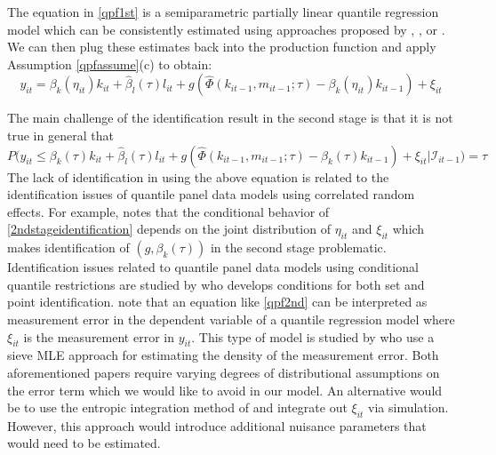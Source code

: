 \documentclass[11pt]{article}
\begin{document}
The equation in \eqref{qpf1st} is a semiparametric partially linear quantile regression model which can be consistently estimated using approaches proposed by \cite{Lee2003}, \cite{KOENKER1994}, or \cite{Chen2009}. We can then plug these estimates back into the production function and apply Assumption \eqref{qpfassume}(c) to obtain:
\begin{equation} \label{qpf2nd}
y_{it}=\beta_{k}(\eta_{it})k_{it}+\hat{\beta}_{l}(\tau)l_{it}+g(\hat{\Phi}(k_{it-1}, m_{it-1}; \tau)-\beta_{k}(\eta_{it})k_{it-1})+\xi_{it}
\end{equation}

The main challenge of the identification result in the second stage is that it is not true in general that
\begin{equation} \label{2ndstageidentification}
P\big(y_{it}\leq \beta_{k}(\tau)k_{it}+\hat{\beta}_{l}(\tau)l_{it}+g(\hat{\Phi}(k_{it-1}, m_{it-1}; \tau)-\beta_{k}(\tau)k_{it-1})+\xi_{it}|\mathcal{I}_{it-1}\big)=\tau
\end{equation}
The lack of identification in using the above equation is related to the identification issues of quantile panel data models using correlated random effects. For example, \cite{Canay2011} notes that the conditional behavior of \eqref{2ndstageidentification} depends on the joint distribution of $\eta_{it}$ and $\xi_{it}$ which makes identification of $(g, \beta_{k}(\tau))$ in the second stage problematic. Identification issues related to quantile panel data models using conditional quantile restrictions are studied by \cite{Rosen2012} who develops conditions for both set and point identification. \cite{Cai2018} note that an equation like \eqref{qpf2nd} can be interpreted as measurement error in the dependent variable of a quantile regression model where $\xi_{it}$ is the measurement error in $y_{it}$. This type of model is studied by \cite{Hausman2019} who use a sieve MLE approach for estimating the density of the measurement error. Both aforementioned papers require varying degrees of distributional assumptions on the error term which we would like to avoid in our model. An alternative would be to use the entropic integration method of \cite{2014a} and integrate out $\xi_{it}$ via simulation. However, this approach would introduce additional nuisance parameters that would need to be estimated. 
\end{document}
